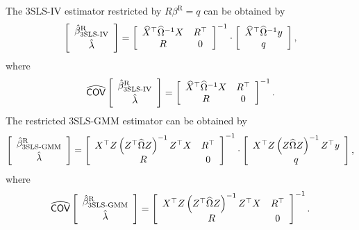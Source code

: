 The 3SLS-IV estimator restricted by $R \beta^\text{R} = q$ can be obtained by
\begin{equation}
   \left[ \begin{array}{c}
      \hat{\beta}^\text{R}_\text{3SLS-IV} \\[0.2em] \hat{\lambda}
   \end{array} \right]
   =
   \left[ \begin{array}{cc}
      \widehat{X}^\top \widehat{\Omega}^{-1} X & R^\top \\
      R & 0
   \end{array} \right]^{-1}
   \cdot
   \left[ \begin{array}{c}
      \widehat{X}^\top \widehat{\Omega}^{-1} y \\ q
   \end{array} \right] ,
   \label{eq:3slsIvR}
\end{equation}
where
\begin{equation}
   \widehat{\mathsf{COV}}
   \left[ \begin{array}{c}
      \hat{\beta}^\text{R}_\text{3SLS-IV} \\[0.2em] \hat{\lambda}
   \end{array} \right] 
   = 
   \left[ \begin{array}{cc}
      \widehat{X}^\top \widehat{\Omega}^{-1} X & R^\top \\
      R & 0
   \end{array} \right]^{-1} .
\end{equation}
The restricted 3SLS-GMM estimator can be obtained by
\begin{equation}
   \left[ \begin{array}{c}
      \hat{\beta}^\text{R}_\text{3SLS-GMM} \\[0.2em] \hat{\lambda}
   \end{array} \right]
   =
   \left[ \begin{array}{cc}
      X^\top Z \left( Z^\top \widehat{\Omega} Z \right)^{-1} Z^\top X & R^\top \\
      R & 0
   \end{array} \right]^{-1}
   \cdot
   \left[ \begin{array}{c}
      X^\top Z \left( Z \widehat{\Omega} Z \right)^{-1} Z^\top y \\ q
   \end{array} \right] ,
   \label{eq:3slsGmmR}
\end{equation}
where
\begin{equation}
   \widehat{\mathsf{COV}}
   \left[ \begin{array}{c}
      \hat{\beta}^\text{R}_\text{3SLS-GMM} \\[0.2em] \hat{\lambda}
   \end{array} \right] 
   = 
   \left[ \begin{array}{cc}
      X^\top Z \left( Z^\top \widehat{\Omega} Z \right)^{-1} Z^\top X & R^\top \\
      R & 0
   \end{array} \right]^{-1} .
\end{equation}
